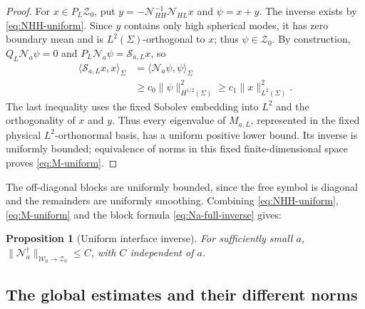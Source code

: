 \documentclass[11pt,a4paper,twoside]{article}
\numberwithin{equation}{section}
\newtheorem{proposition}[theorem]{Proposition}
\theoremstyle{definition}
\theoremstyle{remark}
\begin{document}
\begin{proof}
For \(x\in P_L\mathcal Z_0\), put
\(y=-\mathcal N_{HH}^{-1}\mathcal N_{HL}x\) and \(\psi=x+y\).
The inverse exists by \eqref{eq:NHH-uniform}. Since \(y\) contains
only high spherical modes, it has zero boundary mean and is
\(L^2(\Sigma)\)-orthogonal to \(x\); thus \(\psi\in\mathcal Z_0\).
By construction, \(Q_L\mathcal N_a\psi=0\) and
\(P_L\mathcal N_a\psi=\mathcal S_{a,L}x\), so
\begin{equation}\label{eq:Schur-coercivity}
\begin{aligned}
\langle\mathcal S_{a,L}x,x\rangle_\Sigma
&=\langle\mathcal N_a\psi,\psi\rangle_\Sigma\\
&\ge c_0\|\psi\|_{H^{1/2}(\Sigma)}^2
\ge c_1\|x\|_{L^2(\Sigma)}^2.
\end{aligned}
\end{equation}
The last inequality uses the fixed Sobolev embedding into \(L^2\)
and the orthogonality of \(x\) and \(y\). Thus every eigenvalue of
\(M_{a,L}\), represented in the fixed physical
\(L^2\)-orthonormal basis, has a uniform positive lower bound.
Its inverse is uniformly bounded; equivalence of norms in this
fixed finite-dimensional space proves \eqref{eq:M-uniform}.
\end{proof}
The off-diagonal blocks are uniformly bounded, since the free
symbol is diagonal and the remainders are uniformly smoothing.
Combining \eqref{eq:NHH-uniform}, \eqref{eq:M-uniform} and the
block formula \eqref{eq:Na-full-inverse} gives:
\begin{proposition}[Uniform interface inverse]
\label{prop:Na-uniform}
For sufficiently small \(a\),
\(\|\mathcal N_a^\dagger\|_{\mathcal W_0\to\mathcal Z_0}\le C\),
with \(C\) independent of \(a\).
\end{proposition}

\subsection{The global estimates and their different norms}
\label{subsec:global-Green-estimate}
\end{document}
